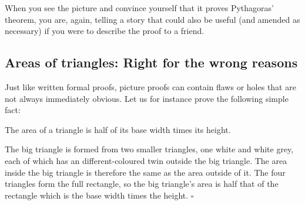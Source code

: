 \medskip
When you see the picture and convince yourself that it proves
Pythagoras' theorem, you are, again, telling a story
that could also be useful (and amended as necessary) if you were to
describe the proof to a friend.


\medskip

\subsection*{Areas of triangles: Right for the wrong reasons}
\noindent
Just like written formal proofs,
picture proofs can contain flaws or holes
that are not always immediately obvious.
Let us for instance prove the following simple fact:

\begin{theorem}
\label{thm:triarea}
The area of a triangle is half of its base width times its height.
\end{theorem}


\begin{center}
\end{center}
The big triangle is formed from two smaller triangles, one white and white grey,
each of which has an different-coloured twin outside the big triangle.
The area inside the big triangle is therefore the same as the area outside of it.
The four triangles form the full rectangle,
so the big triangle's area is half that of the rectangle
which is the base width times the height.
\hfill$\square$

